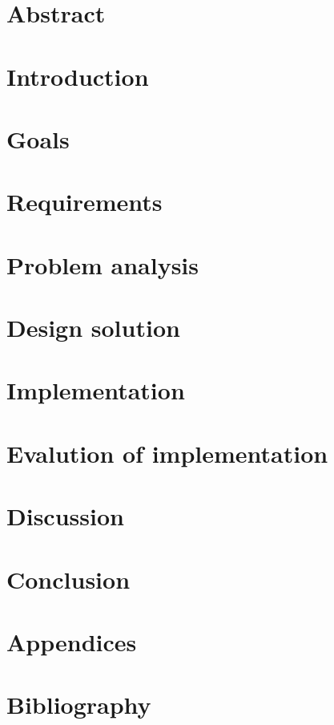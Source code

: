 \documentclass{article}
\begin{document}

\clearpage

\section*{Abstract}

\clearpage

\tableofcontents
\clearpage

\section{Introduction}

\clearpage

\section{Goals}

\clearpage

\section{Requirements}

\clearpage

\section{Problem analysis}

\clearpage

\section{Design solution}

\clearpage

\section{Implementation}

\clearpage

\section{Evalution of implementation}

\clearpage

\section{Discussion}

\clearpage

\section{Conclusion}

\clearpage

\section{Appendices}

\clearpage

\section{Bibliography}

\clearpage
\end{document}
